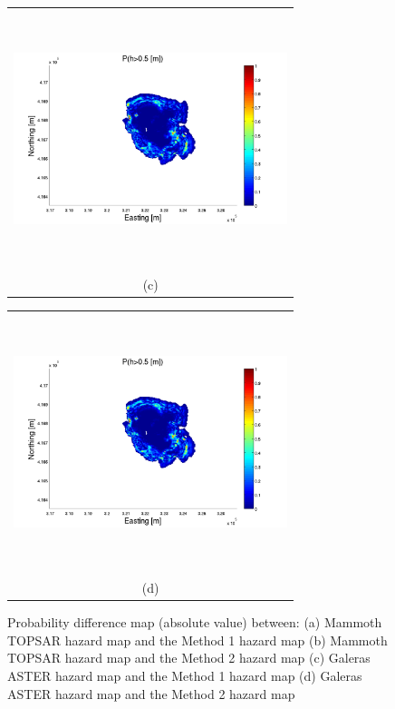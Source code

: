 \documentclass[12pt]{article}
\newcommand{\Pic}[2][0.85]{\begin{center}\texttt{[image: \#2]}
 \end{center} }
\begin{document}
\begin{figure}[H]
\begin{minipage}[b]{0.6\textwidth}
\begin{tabular}{c}
       \includegraphics[width=8cm,height=7.5cm,keepaspectratio]{Mammoth0_minus_Aster30.pdf}\\
        (c)
        \end{tabular}
    \end{minipage}
    \begin{minipage}{0.6\textwidth}
        \begin{tabular}{c}
	\includegraphics[width=8cm,height=7.5cm,keepaspectratio]{Mammoth0_minus_Aster30.pdf}\\
        (d)
        \end{tabular}
    \end{minipage} 
    \caption{ Probability difference map (absolute value) between: (a)
      Mammoth TOPSAR hazard map and the Method 1 hazard map (b)
      Mammoth TOPSAR hazard map and the Method 2 hazard map (c)
      Galeras ASTER hazard map and the Method 1 hazard map (d) Galeras
      ASTER hazard map and the Method 2 hazard map}
\label{fig8}  
\end{figure}
\end{document}
